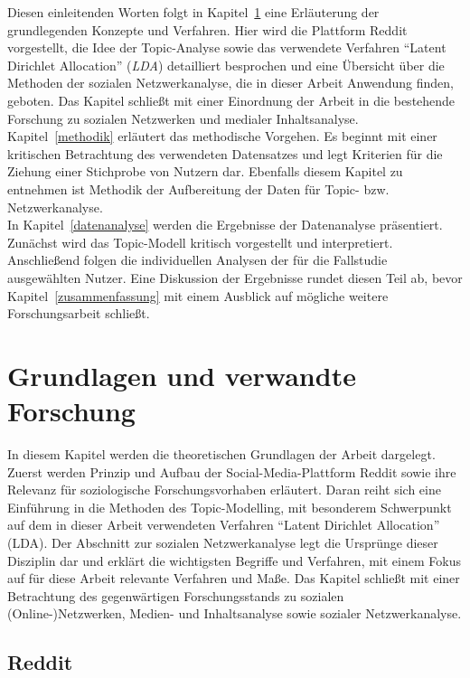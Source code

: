 \documentclass[11pt,a4paper,twoside]{article}
\begin{document}
Diesen einleitenden Worten folgt in Kapitel~\ref{grundlagen} eine
Erläuterung der grundlegenden Konzepte und Verfahren. Hier wird die
Plattform Reddit vorgestellt, die Idee der Topic-Analyse sowie das
verwendete Verfahren \enquote{Latent Dirichlet Allocation} (\emph{LDA})
detailliert besprochen und eine Übersicht über die Methoden der sozialen
Netzwerkanalyse, die in dieser Arbeit Anwendung finden, geboten. Das
Kapitel schließt mit einer Einordnung der Arbeit in die bestehende
Forschung zu sozialen Netzwerken und medialer Inhaltsanalyse.\\
Kapitel~\ref{methodik} erläutert das methodische Vorgehen. Es beginnt
mit einer kritischen Betrachtung des verwendeten Datensatzes und legt
Kriterien für die Ziehung einer Stichprobe von Nutzern dar. Ebenfalls
diesem Kapitel zu entnehmen ist Methodik der Aufbereitung der Daten für
Topic- bzw. Netzwerkanalyse.\\
In Kapitel~\ref{datenanalyse} werden die Ergebnisse der Datenanalyse
präsentiert. Zunächst wird das Topic-Modell kritisch vorgestellt und
interpretiert. Anschließend folgen die individuellen Analysen der für
die Fallstudie ausgewählten Nutzer. Eine Diskussion der Ergebnisse
rundet diesen Teil ab, bevor Kapitel~\ref{zusammenfassung} mit einem
Ausblick auf mögliche weitere Forschungsarbeit schließt.

\cleardoublepage

\hypertarget{grundlagen}{%
\section{Grundlagen und verwandte Forschung}\label{grundlagen}}

In diesem Kapitel werden die theoretischen Grundlagen der Arbeit
dargelegt. Zuerst werden Prinzip und Aufbau der Social-Media-Plattform
Reddit sowie ihre Relevanz für soziologische Forschungsvorhaben
erläutert. Daran reiht sich eine Einführung in die Methoden des
Topic-Modelling, mit besonderem Schwerpunkt auf dem in dieser Arbeit
verwendeten Verfahren \enquote{Latent Dirichlet Allocation} (LDA). Der
Abschnitt zur sozialen Netzwerkanalyse legt die Ursprünge dieser
Disziplin dar und erklärt die wichtigsten Begriffe und Verfahren, mit
einem Fokus auf für diese Arbeit relevante Verfahren und Maße. Das
Kapitel schließt mit einer Betrachtung des gegenwärtigen
Forschungsstands zu sozialen (Online-)Netzwerken, Medien- und
Inhaltsanalyse sowie sozialer Netzwerkanalyse.

\hypertarget{reddit}{%
\subsection{Reddit}\label{reddit}}
\end{document}

